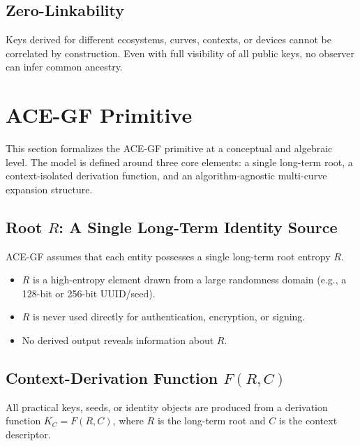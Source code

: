 \documentclass[11pt,a4paper]{article}
\begin{document}
\subsection{Zero-Linkability}
Keys derived for different ecosystems, curves, contexts, or devices cannot be correlated by construction. Even with full visibility of all public keys, no observer can infer common ancestry.

\section{ACE-GF Primitive}
This section formalizes the ACE-GF primitive at a conceptual and algebraic level. The model is defined around three core elements: a single long-term root, a context-isolated derivation function, and an algorithm-agnostic multi-curve expansion structure.
\begin{figure}[htbp]
  \centering
\end{figure}

\subsection{Root $R$: A Single Long-Term Identity Source}
ACE-GF assumes that each entity possesses a single long-term root entropy $R$.
\begin{itemize}[noitemsep, nolistsep]
    \item $R$ is a high-entropy element drawn from a large randomness domain (e.g., a 128-bit or 256-bit UUID/seed).
    \item $R$ is never used directly for authentication, encryption, or signing.
    \item No derived output reveals information about $R$.
\end{itemize}

\subsection{Context-Derivation Function $F(R, C)$}
All practical keys, seeds, or identity objects are produced from a derivation function $K_C = F(R, C)$, where $R$ is the long-term root and $C$ is the context descriptor.
\end{document}
